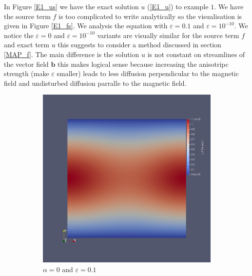 \documentclass[12pt]{ociamthesis}
\begin{document}
In Figure \ref{E1_us} we have the exact solution $u$ (\ref{E1_u}) to example $1$. We have the source term $f$ is too complicated to write analytically so the visualisation is given in Figure \ref{E1_fs}. We analysis the equation with $\varepsilon = 0.1$ and $\varepsilon = 10^{-10}$. We notice the $\varepsilon = 0$ and $\varepsilon = 10^{-10}$ variants are visually similar for the source term $f$ and exact term $u$ this suggests to consider a method discussed in section \ref{MAP_f}. The main difference is the solution $u$ is not constant on streamlines of the vector field $\mathbf{b}$ this makes logical sense because increasing the anisotripc strength (make $\varepsilon$ smaller) leads to less diffusion perpendicular to the magnetic field and undisturbed diffusion parralle to the magnetic field.
\begin{figure}[H]
 \begin{subfigure}{0.44\textwidth}
     \includegraphics[width=\textwidth]{Pics/uf/U_E1a_eps1.png}
     \caption{$\alpha=0$ and $\varepsilon = 0.1$}
 \end{subfigure}
   \begin{subfigure}{0.44\textwidth}

\end{subfigure}
\end{figure}
\end{document}

